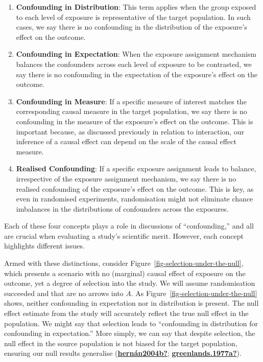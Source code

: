 \documentclass[
  singlecolumn]{report}
\begin{document}
\begin{enumerate}
\def\labelenumi{\arabic{enumi}.}
\item
  \textbf{Confounding in Distribution}: This term applies when the group
  exposed to each level of exposure is representative of the target
  population. In such cases, we say there is no confounding in the
  distribution of the exposure's effect on the outcome.
\item
  \textbf{Confounding in Expectation}: When the exposure assignment
  mechanism balances the confounders across each level of exposure to be
  contrasted, we say there is no confounding in the expectation of the
  exposure's effect on the outcome.
\item
  \textbf{Confounding in Measure}: If a specific measure of interest
  matches the corresponding causal measure in the target population, we
  say there is no confounding in the measure of the exposure's effect on
  the outcome. This is important because, as discussed previously in
  relation to interaction, our inference of a causal effect can depend
  on the scale of the causal effect measure.
\item
  \textbf{Realised Confounding}: If a specific exposure assignment leads
  to balance, irrespective of the exposure assignment mechanism, we say
  there is no realised confounding of the exposure's effect on the
  outcome. This is key, as even in randomised experiments, randomisation
  might not eliminate chance imbalances in the distributions of
  confounders across the exposures.
\end{enumerate}

Each of these four concepts plays a role in discussions of
``confounding,'' and all are crucial when evaluating a study's
scientific merit. However, each concept highlights different issues.

Armed with these distinctions, consider
Figure~\ref{fig-selection-under-the-null}, which presents a scenario
with no (marginal) causal effect of exposure on the outcome, yet a
degree of selection into the study. We will assume randomisation
succeeded and that are no arrows into \(A\). As
Figure~\ref{fig-selection-under-the-null} shows, neither confounding in
expectation nor in distribution is present. The null effect estimate
from the study will accurately reflect the true null effect in the
population. We might say that selection leads to ``confounding in
distribution for confounding in expectation.'' More simply, we can say
that despite selection, the null effect in the source population is not
biased for the target population, ensuring our null results generalise
(\protect\hyperlink{ref-hernuxe1n2004b}{\textbf{hernán2004b?}};
\protect\hyperlink{ref-greenlands.1977a}{\textbf{greenlands.1977a?}}).
\end{document}
